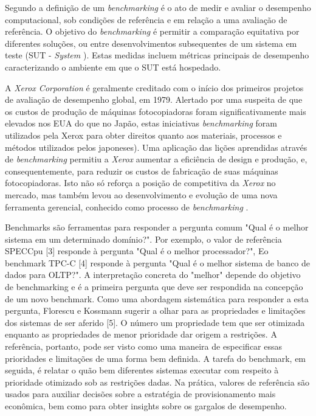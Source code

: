 Segundo \cite{Stefan2010} a definição de um \textit{benchmarking} é o ato de medir e avaliar o desempenho computacional, sob condições de referência e em relação a uma avaliação de referência. O objetivo do \textit{benchmarking} é permitir a comparação equitativa por diferentes soluções, ou entre desenvolvimentos subsequentes de um sistema em teste (SUT - \textit{System }). Estas medidas incluem métricas principais de desempenho caracterizando o ambiente em que o SUT está hospedado.

A \textit{Xerox Corporation} é geralmente creditado com o início dos primeiros projetos de avaliação de desempenho global, em 1979. Alertado por uma suspeita de que os custos de produção de máquinas fotocopiadoras foram significativamente mais elevados nos EUA do que no Japão, estas iniciativas \textit{benchmarking} foram utilizados pela Xerox para obter direitos quanto aos materiais, processos e métodos utilizados pelos japoneses). Uma aplicação das lições aprendidas através de \textit{benchmarking} permitiu a \textit{Xerox} aumentar a eficiência de design e produção, e, consequentemente, para reduzir os custos de fabricação de suas máquinas fotocopiadoras. Isto não só reforça a posição de competitiva da \textit{Xerox} no mercado, mas também levou ao desenvolvimento e evolução de uma nova ferramenta gerencial, conhecido como processo de \textit{benchmarking} \cite{Mahmoud2002}.

Benchmarks são ferramentas para responder a pergunta comum "Qual é o melhor sistema em um determinado domínio?". Por exemplo, o valor de referência SPECCpu [3] responde à pergunta "Qual é o melhor processador?", Eo benchmark TPC-C [4] responde à pergunta "Qual é o melhor sistema de banco de dados para OLTP?".
A interpretação concreta do "melhor" depende do objetivo de benchmarking
e é a primeira pergunta que deve ser respondida na concepção de um novo
benchmark. Como uma abordagem sistemática para responder a esta pergunta, Florescu e Kossmann sugerir a olhar para as propriedades e limitações dos sistemas de ser aferido [5]. O número um propriedade tem que ser otimizada enquanto as propriedades de menor prioridade dar origem a restrições. A referência, portanto, pode ser visto como uma maneira de especificar essas prioridades e limitações de uma forma bem definida. A tarefa do benchmark, em seguida, é relatar o quão bem diferentes sistemas executar com respeito à prioridade otimizado sob as restrições dadas.
Na prática, valores de referência são usados para auxiliar decisões sobre a estratégia de provisionamento mais econômica, bem como para obter insights sobre os gargalos de desempenho.

